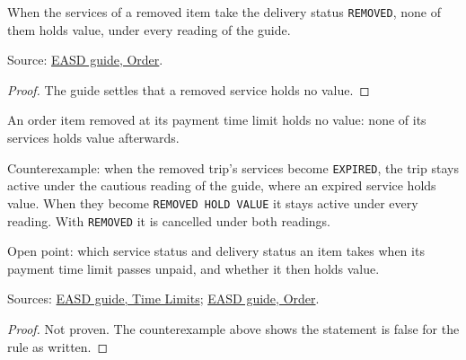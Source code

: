 \begin{theorem}
  \label{thm:payment-removed-to-removed}
  When the services of a removed item take the delivery status
  \texttt{REMOVED}, none of them holds value, under every reading of the
  guide.

  Source: \href{https://standards.atlassian.net/wiki/spaces/EASD/pages/574849062/Order}{EASD guide, Order}.
\end{theorem}
\begin{proof}
  The guide settles that a removed service holds no value.
\end{proof}

\begin{theorem}
  \label{thm:payment-removed-no-value}
  An order item removed at its payment time limit holds no value: none of its
  services holds value afterwards.

  Counterexample: when the removed trip's services become \texttt{EXPIRED},
  the trip stays active under the cautious reading of the guide, where an
  expired service holds value.  When they become \texttt{REMOVED HOLD VALUE}
  it stays active under every reading.  With \texttt{REMOVED} it is cancelled
  under both readings.

  Open point: which service status and delivery status an item takes when its
  payment time limit passes unpaid, and whether it then holds value.

  Sources: \href{https://standards.atlassian.net/wiki/spaces/EASD/pages/574423066/Time+Limits}{EASD guide, Time Limits};
  \href{https://standards.atlassian.net/wiki/spaces/EASD/pages/574849062/Order}{EASD guide, Order}.
\end{theorem}
\begin{proof}
  Not proven.  The counterexample above shows the statement is false for the
  rule as written.
\end{proof}

